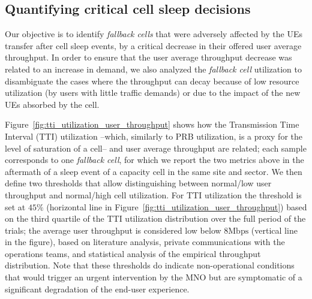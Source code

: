 
\vspace{-2pt}
\subsection{Quantifying critical cell sleep decisions}
\vspace{-2pt}

Our objective is to identify  \textit{fallback cells} that were adversely affected by the UEs transfer after cell sleep events, \ie by a critical decrease in their offered user average throughput.
In order to ensure that the user average throughput decrease was related to an increase in demand, we also analyzed the \textit{fallback cell} utilization to disambiguate the cases where the throughput can decay because of low resource utilization (\eg by users with little traffic demands) or due to the impact of the new UEs absorbed by the cell.

Figure~\ref{fig:tti_utilization_user_throughput} shows how the Transmission Time Interval (TTI) utilization --which, similarly to PRB utilization, is a proxy for the level of saturation of a cell-- and user average throughput are related; each sample corresponds to one \textit{fallback cell}, for which we report the two metrics above in the aftermath of a sleep event of a capacity cell in the same site and sector.
We then define two thresholds that allow distinguishing between normal/low user throughput and normal/high cell utilization.
For TTI utilization the threshold is set at $45\%$ (horizontal line in Figure~\ref{fig:tti_utilization_user_throughput}) based on the third quartile of the TTI utilization distribution over the full period of the trials; the average user throughput is considered low below $8\text{Mbps}$ (vertical line in the figure), based on literature analysis, private communications with the operations teams, and statistical analysis of the empirical throughput distribution. 
Note that these thresholds do indicate non-operational conditions that would trigger an urgent intervention by the MNO but are symptomatic of a significant degradation of the end-user experience.

